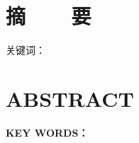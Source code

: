 {    %
    \chapter*{\centering\erhao\bf{摘~~~~要}}
    \setcounter{page}{1}
    \song{}
    \@cabstract
    \vspace{\baselineskip}

    \noindent
    {\hei\sihao 关键词：} \@ckeywords

    \clearpage{\pagestyle{empty}\cleardoublepage}
    \chapter*{\centering\erhao\bf{ABSTRACT}}
    \@eabstract
    \vspace{\baselineskip}

    \noindent
    {\sihao\textbf{KEY WORDS：}}  \@ekeywords
}

\makeatother

\newcommand{\argmax}{\operatornamewithlimits{arg\,max}}
\newcommand{\argmin}{\operatornamewithlimits{arg\,min}}
